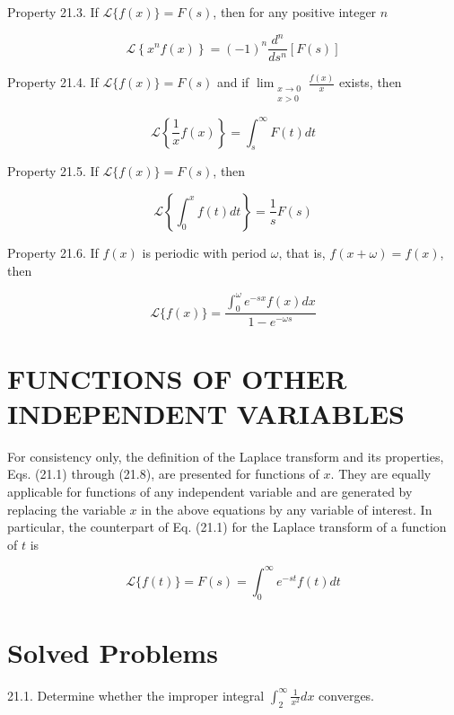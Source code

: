 \documentclass[10pt]{article}
\begin{document}
Property 21.3. If $\mathscr{L}\{f(x)\}=F(s)$, then for any positive integer $n$


\begin{equation*}
\mathscr{L}\left\{x^{n} f(x)\right\}=(-1)^{n} \frac{d^{n}}{d s^{n}}[F(s)] \tag{21.5}
\end{equation*}


Property 21.4. If $\mathscr{L}\{f(x)\}=F(s)$ and if $\lim _{\substack{x \rightarrow 0 \\ x>0}} \frac{f(x)}{x}$ exists, then


\begin{equation*}
\mathscr{L}\left\{\frac{1}{x} f(x)\right\}=\int_{s}^{\infty} F(t) d t \tag{21.6}
\end{equation*}


Property 21.5. If $\mathscr{L}\{f(x)\}=F(s)$, then


\begin{equation*}
\mathscr{L}\left\{\int_{0}^{x} f(t) d t\right\}=\frac{1}{s} F(s) \tag{21.7}
\end{equation*}


Property 21.6. If $f(x)$ is periodic with period $\omega$, that is, $f(x+\omega)=f(x)$, then


\begin{equation*}
\mathscr{L}\{f(x)\}=\frac{\int_{0}^{\omega} e^{-s x} f(x) d x}{1-e^{-\omega s}} \tag{21.8}
\end{equation*}


\section*{FUNCTIONS OF OTHER INDEPENDENT VARIABLES}
For consistency only, the definition of the Laplace transform and its properties, Eqs. (21.1) through (21.8), are presented for functions of $x$. They are equally applicable for functions of any independent variable and are generated by replacing the variable $x$ in the above equations by any variable of interest. In particular, the counterpart of Eq. (21.1) for the Laplace transform of a function of $t$ is

$$
\mathscr{L}\{f(t)\}=F(s)=\int_{0}^{\infty} e^{-s t} f(t) d t
$$

\section*{Solved Problems}
21.1. Determine whether the improper integral $\int_{2}^{\infty} \frac{1}{x^{2}} d x$ converges.
\end{document}
